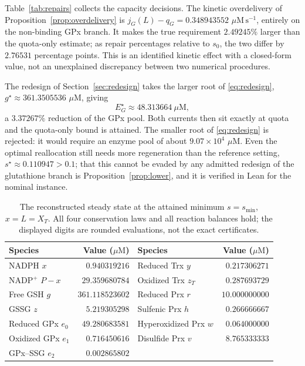 \documentclass[11pt,a4paper]{article}
\theoremstyle{plain}
\theoremstyle{definition}
\theoremstyle{remark}
\newcommand{\uM}{\ensuremath{\mu\mathrm{M}}}
\newcommand{\fluxunit}{\ensuremath{\mu\mathrm{M}\,\mathrm{s}^{-1}}}
\begin{document}
Table~\ref{tab:repairs} collects the capacity decisions. The kinetic overdelivery
of Proposition~\ref{prop:overdelivery} is
$j_G(L)-q_G=0.348943552$ \fluxunit, entirely on the non-binding GPx branch. It
makes the true requirement $2.49245\%$ larger than the quota-only estimate; as
repair percentages relative to $s_0$, the two differ by $2.76531$ percentage
points. This is an identified kinetic effect with a closed-form value, not an
unexplained discrepancy between two numerical procedures.

The redesign of Section~\ref{sec:redesign} takes the larger root of
\eqref{eq:redesign}, $g^\star\approx361.3505536$ \uM, giving
\[
  E_G^\star\approx48.313664\ \uM,
\]
a $3.37267\%$ reduction of the GPx pool. Both currents then sit exactly at quota
and the quota-only bound is attained. The smaller root of \eqref{eq:redesign} is
rejected: it would require an enzyme pool of about $9.07\times10^4$ \uM. Even the
optimal reallocation still needs more regeneration than the reference setting,
$s^\star\approx0.110947>0.1$; that this cannot be evaded by any admitted redesign
of the glutathione branch is Proposition~\ref{prop:lower}, and it is verified in
Lean for the nominal instance.

\begin{table}[tb]
\centering\small
\caption{The reconstructed steady state at the attained minimum
$s=s_{\min}$, $x=L=X_T$. All four conservation laws and all reaction balances hold;
the displayed digits are rounded evaluations, not the exact certificates.}
\label{tab:boundary}
\begin{tabular}{lr@{\qquad}lr}
\toprule
Species & Value (\uM) & Species & Value (\uM)\\
\midrule
NADPH $x$              & $0.940319216$  & Reduced Trx $y$        & $0.217306271$\\
NADP$^+$ $P-x$         & $29.359680784$ & Oxidized Trx $z_T$     & $0.287693729$\\
Free GSH $g$           & $361.118523602$& Reduced Prx $r$        & $10.000000000$\\
GSSG $z$               & $5.219305298$  & Sulfenic Prx $h$       & $0.266666667$\\
Reduced GPx $e_0$      & $49.280683581$ & Hyperoxidized Prx $w$  & $0.064000000$\\
Oxidized GPx $e_1$     & $0.716450616$  & Disulfide Prx $v$      & $8.765333333$\\
GPx--SSG $e_2$         & $0.002865802$  & & \\
\bottomrule
\end{tabular}
\end{table}
\end{document}
